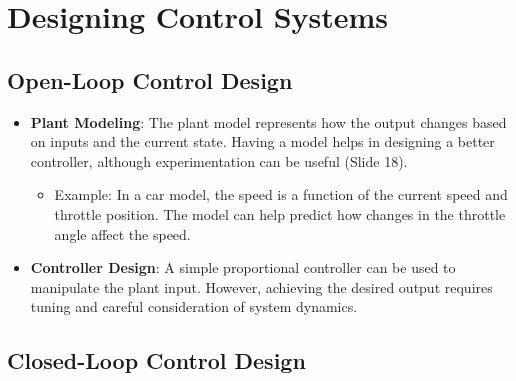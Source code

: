 \documentclass[
  14pt,
  a4paper,
  numbers=noendperiod,
  headinclude=true,
  footinclude=true,
  DIV=calc]{scrreprt}
\providecommand{\tightlist}{%
  \setlength{\itemsep}{0pt}\setlength{\parskip}{0pt}}\usepackage{longtable,booktabs,array}
\begin{document}
\section{Designing Control Systems}\label{designing-control-systems}

\subsection{Open-Loop Control Design}\label{open-loop-control-design}

\begin{itemize}
\item
  \textbf{Plant Modeling}: The plant model represents how the output
  changes based on inputs and the current state. Having a model helps in
  designing a better controller, although experimentation can be useful
  (Slide 18).

  \begin{itemize}
  \tightlist
  \item
    Example: In a car model, the speed is a function of the current
    speed and throttle position. The model can help predict how changes
    in the throttle angle affect the speed.
  \end{itemize}
\item
  \textbf{Controller Design}: A simple proportional controller can be
  used to manipulate the plant input. However, achieving the desired
  output requires tuning and careful consideration of system dynamics.
\end{itemize}

\subsection{Closed-Loop Control
Design}\label{closed-loop-control-design}
\end{document}
